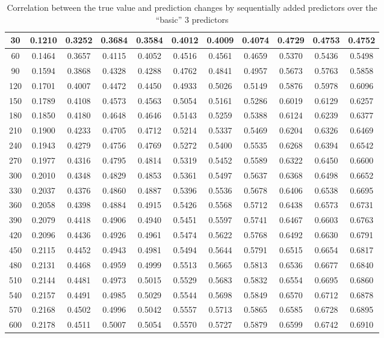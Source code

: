 \begin{table}[h!]
{\begin{tabular}{||c c c c c c c c c c c||}
30 & 0.1210 & 0.3252 & 0.3684 & 0.3584 & 0.4012 & 0.4009 & 0.4074 & 0.4729 & 0.4753 & 0.4752 \\ \hline
        60 & 0.1464 & 0.3657 & 0.4115 & 0.4052 & 0.4516 & 0.4561 & 0.4659 & 0.5370 & 0.5436 & 0.5498 \\ \hline
        90 & 0.1594 & 0.3868 & 0.4328 & 0.4288 & 0.4762 & 0.4841 & 0.4957 & 0.5673 & 0.5763 & 0.5858 \\ \hline
        120 & 0.1701 & 0.4007 & 0.4472 & 0.4450 & 0.4933 & 0.5026 & 0.5149 & 0.5876 & 0.5978 & 0.6096 \\ \hline
        150 & 0.1789 & 0.4108 & 0.4573 & 0.4563 & 0.5054 & 0.5161 & 0.5286 & 0.6019 & 0.6129 & 0.6257 \\ \hline
        180 & 0.1850 & 0.4180 & 0.4648 & 0.4646 & 0.5143 & 0.5259 & 0.5388 & 0.6124 & 0.6239 & 0.6377 \\ \hline
        210 & 0.1900 & 0.4233 & 0.4705 & 0.4712 & 0.5214 & 0.5337 & 0.5469 & 0.6204 & 0.6326 & 0.6469 \\ \hline
        240 & 0.1943 & 0.4279 & 0.4756 & 0.4769 & 0.5272 & 0.5400 & 0.5535 & 0.6268 & 0.6394 & 0.6542 \\ \hline
        270 & 0.1977 & 0.4316 & 0.4795 & 0.4814 & 0.5319 & 0.5452 & 0.5589 & 0.6322 & 0.6450 & 0.6600 \\ \hline
        300 & 0.2010 & 0.4348 & 0.4829 & 0.4853 & 0.5361 & 0.5497 & 0.5637 & 0.6368 & 0.6498 & 0.6652 \\ \hline
        330 & 0.2037 & 0.4376 & 0.4860 & 0.4887 & 0.5396 & 0.5536 & 0.5678 & 0.6406 & 0.6538 & 0.6695 \\ \hline
        360 & 0.2058 & 0.4398 & 0.4884 & 0.4915 & 0.5426 & 0.5568 & 0.5712 & 0.6438 & 0.6573 & 0.6731 \\ \hline
        390 & 0.2079 & 0.4418 & 0.4906 & 0.4940 & 0.5451 & 0.5597 & 0.5741 & 0.6467 & 0.6603 & 0.6763 \\ \hline
        420 & 0.2096 & 0.4436 & 0.4926 & 0.4961 & 0.5474 & 0.5622 & 0.5768 & 0.6492 & 0.6630 & 0.6791 \\ \hline
        450 & 0.2115 & 0.4452 & 0.4943 & 0.4981 & 0.5494 & 0.5644 & 0.5791 & 0.6515 & 0.6654 & 0.6817 \\ \hline
        480 & 0.2131 & 0.4468 & 0.4959 & 0.4999 & 0.5513 & 0.5665 & 0.5813 & 0.6536 & 0.6677 & 0.6840 \\ \hline
        510 & 0.2144 & 0.4481 & 0.4973 & 0.5015 & 0.5529 & 0.5683 & 0.5832 & 0.6554 & 0.6695 & 0.6860 \\ \hline
        540 & 0.2157 & 0.4491 & 0.4985 & 0.5029 & 0.5544 & 0.5698 & 0.5849 & 0.6570 & 0.6712 & 0.6878 \\ \hline
        570 & 0.2168 & 0.4502 & 0.4996 & 0.5042 & 0.5557 & 0.5713 & 0.5865 & 0.6585 & 0.6728 & 0.6895 \\ \hline
        600 & 0.2178 & 0.4511 & 0.5007 & 0.5054 & 0.5570 & 0.5727 & 0.5879 & 0.6599 & 0.6742 & 0.6910 \\ \hline \hline
\end{tabular}}
\caption{Correlation between the true value and prediction changes by sequentially added predictors over the “basic” 3 predictors}
\label{table:Corr}
\end{table}

